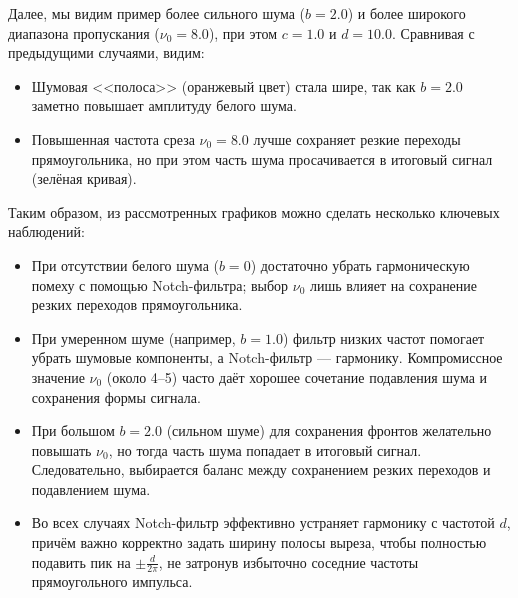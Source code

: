 \documentclass[a4paper]{article}
\begin{document}
Далее, мы видим пример более сильного шума ($b=2.0$) и более широкого диапазона пропускания ($\nu_0=8.0$), при этом $c=1.0$ и $d=10.0$. Сравнивая с предыдущими случаями, видим:
\begin{itemize}
    \item Шумовая <<полоса>> (оранжевый цвет) стала шире, так как $b=2.0$ заметно повышает амплитуду белого шума.
    \item Повышенная частота среза $\nu_0=8.0$ лучше сохраняет резкие переходы прямоугольника, но при этом часть шума просачивается в итоговый сигнал (зелёная кривая). 
\end{itemize}
\noindent Таким образом, из рассмотренных графиков можно сделать несколько ключевых наблюдений:
\begin{itemize}
    \item При отсутствии белого шума ($b=0$) достаточно убрать гармоническую помеху с помощью Notch-фильтра; выбор $\nu_0$ лишь влияет на сохранение резких переходов прямоугольника.
    \item При умеренном шуме (например, $b=1.0$) фильтр низких частот помогает убрать шумовые компоненты, а Notch-фильтр --- гармонику. Компромиссное значение $\nu_0$ (около 4--5) часто даёт хорошее сочетание подавления шума и сохранения формы сигнала.
    \item При большом $b=2.0$ (сильном шуме) для сохранения фронтов желательно повышать $\nu_0$, но тогда часть шума попадает в итоговый сигнал. Следовательно, выбирается баланс между сохранением резких переходов и подавлением шума.
    \item Во всех случаях Notch-фильтр эффективно устраняет гармонику с частотой $d$, причём важно корректно задать ширину полосы выреза, чтобы полностью подавить пик на $\pm \frac{d}{2\pi}$, не затронув избыточно соседние частоты прямоугольного импульса.
\end{itemize}
\end{document}
